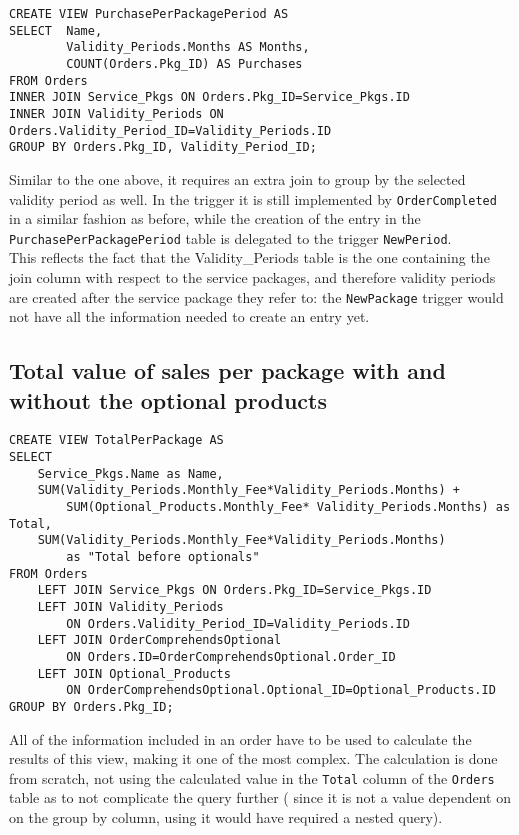 \begin{lstlisting}[style=SQL]
CREATE VIEW PurchasePerPackagePeriod AS
SELECT  Name,
        Validity_Periods.Months AS Months,
        COUNT(Orders.Pkg_ID) AS Purchases
FROM Orders
INNER JOIN Service_Pkgs ON Orders.Pkg_ID=Service_Pkgs.ID
INNER JOIN Validity_Periods ON Orders.Validity_Period_ID=Validity_Periods.ID
GROUP BY Orders.Pkg_ID, Validity_Period_ID;
\end{lstlisting}

Similar to the one above, it requires an extra join to group by the selected validity period as well. In the trigger it is still implemented by \texttt{OrderCompleted} in a similar fashion as before, while the creation of the entry in the \texttt{PurchasePerPackagePeriod} table is delegated to the trigger \texttt{NewPeriod}. \\

This reflects the fact that the Validity\_Periods table is the one containing the join column with respect to the service packages, and therefore validity periods are created after the service package they refer to: the \texttt{NewPackage} trigger would not have all the information needed to create an entry yet.

\subsection{Total value of sales per package with and without the optional products}

\begin{lstlisting}[style=SQL]
CREATE VIEW TotalPerPackage AS
SELECT
    Service_Pkgs.Name as Name,
    SUM(Validity_Periods.Monthly_Fee*Validity_Periods.Months) +
        SUM(Optional_Products.Monthly_Fee* Validity_Periods.Months) as Total,
    SUM(Validity_Periods.Monthly_Fee*Validity_Periods.Months)
        as "Total before optionals"
FROM Orders
    LEFT JOIN Service_Pkgs ON Orders.Pkg_ID=Service_Pkgs.ID
    LEFT JOIN Validity_Periods
        ON Orders.Validity_Period_ID=Validity_Periods.ID
    LEFT JOIN OrderComprehendsOptional
        ON Orders.ID=OrderComprehendsOptional.Order_ID
    LEFT JOIN Optional_Products
        ON OrderComprehendsOptional.Optional_ID=Optional_Products.ID
GROUP BY Orders.Pkg_ID;

\end{lstlisting}

All of the information included in an order have to be used to calculate the results of this view, making it one of the most complex. The calculation is done from scratch, not using the calculated value in the \texttt{Total}  column of the \texttt{Orders}  table as to not complicate the query further ( since it is not a value dependent on on the group by column, using it would have required a nested query).\\

